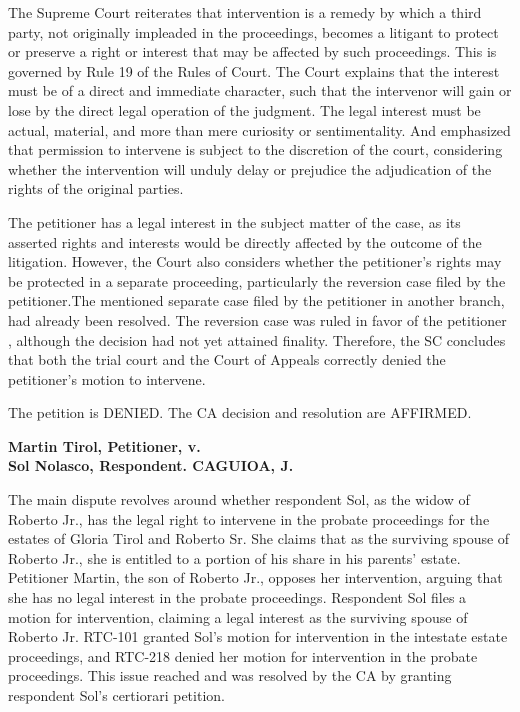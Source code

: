 \documentclass[
12pt,
oneside,
onehalfspacing,
headsepline
]{DigestCollection}
\begin{document}
The Supreme Court reiterates that intervention is a remedy by which a third party, not originally impleaded in the proceedings, becomes a litigant to protect or preserve a right or interest that may be affected by such proceedings. This is governed by Rule 19 of the Rules of Court. The Court explains that the interest must be of a direct and immediate character, such that the intervenor will gain or lose by the direct legal operation of the judgment. The legal interest must be actual, material, and more than mere curiosity or sentimentality. And emphasized that permission to intervene is subject to the discretion of the court, considering whether the intervention will unduly delay or prejudice the adjudication of the rights of the original parties. 

The petitioner has a legal interest in the subject matter of the case, as its asserted rights and interests would be directly affected by the outcome of the litigation. However, the Court also considers whether the petitioner's rights may be protected in a separate proceeding, particularly the reversion case filed by the petitioner.The mentioned separate case filed by the petitioner in another branch, had already been resolved. The reversion case was ruled in favor of the petitioner , although the decision had not yet attained finality. Therefore, the SC concludes that both the trial court and the Court of Appeals correctly denied the petitioner's motion to intervene.

The petition is DENIED. The CA decision and resolution are AFFIRMED.

\label{00b23c10-0a10-11ef-932c-63c852f65e48}


\noindent\textbf{Martin Tirol, Petitioner, v. \\Sol Nolasco, Respondent. CAGUIOA, J.}\vspace{0.4cm}

The main dispute revolves around whether respondent Sol, as the widow of Roberto Jr., has the legal right to intervene in the probate proceedings for the estates of Gloria Tirol and Roberto Sr. She claims that as the surviving spouse of Roberto Jr., she is entitled to a portion of his share in his parents' estate. Petitioner Martin, the son of Roberto Jr., opposes her intervention, arguing that she has no legal interest in the probate proceedings. Respondent Sol files a motion for intervention, claiming a legal interest as the surviving spouse of Roberto Jr. RTC-101 granted Sol's motion for intervention in the intestate estate proceedings, and RTC-218 denied her motion for intervention in the probate proceedings. This issue reached and was resolved by the CA by granting respondent Sol's certiorari petition. 
\end{document}
